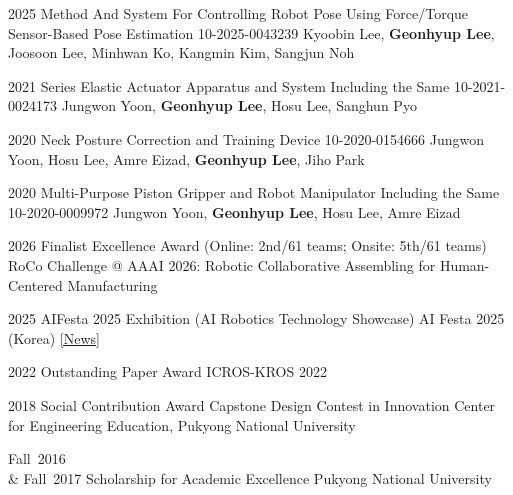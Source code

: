 \documentclass[9pt]{developercv} %
\begin{document}
{\begin{entrylist}
	\entry
        {2025}
		{Method And System For Controlling Robot Pose Using Force/Torque Sensor-Based Pose Estimation}
		{10-2025-0043239}
		{\vspace{-10pt}
             Kyoobin Lee, \textbf{Geonhyup Lee}, Joosoon Lee, Minhwan Ko, Kangmin Kim, Sangjun Noh \\
            }
    
	\entry
        {2021}
		{Series Elastic Actuator Apparatus and System Including the Same}
		{10-2021-0024173}
		{\vspace{-10pt}
             Jungwon Yoon, \textbf{Geonhyup Lee}, Hosu Lee, Sanghun Pyo \\
            }

    \entry
        {2020}
		{Neck Posture Correction and Training Device}
		{10-2020-0154666}
		{\vspace{-10pt}
            Jungwon Yoon, Hosu Lee, Amre Eizad, \textbf{Geonhyup Lee}, Jiho Park \\
            }

    \entry
        {2020}
		{Multi-Purpose Piston Gripper and Robot Manipulator Including the Same}
		{10-2020-0009972}
		{\vspace{-10pt}
            Jungwon Yoon, \textbf{Geonhyup Lee}, Hosu Lee, Amre Eizad \\
            }
\end{entrylist}

\begin{entrylist}
        
    \entry
        {2026}
        {Finalist Excellence Award (Online: 2nd/61 teams; Onsite: 5th/61 teams)}
        {RoCo Challenge @ AAAI 2026: Robotic Collaborative Assembling for Human-Centered Manufacturing}

    \entry
        {2025}
        {AIFesta 2025 Exhibition (AI Robotics Technology Showcase)}
        {AI Festa 2025 (Korea)}
        {\textcolor{blue}{\href{https://zdnet.co.kr/view/?no=20251001083046}{[News]}}}

	\entry
        {2022}
		{Outstanding Paper Award}
		{ICROS-KROS 2022}
		{
               
            }
	\entry
        {2018}
		{Social Contribution Award}
		{Capstone Design Contest in Innovation Center for Engineering Education, Pukyong National University}

      \entry
       {Fall~2016 \\ \& Fall~2017}
          {Scholarship for Academic Excellence}
          {Pukyong National University}
          {}



\end{entrylist}}
\end{document}
